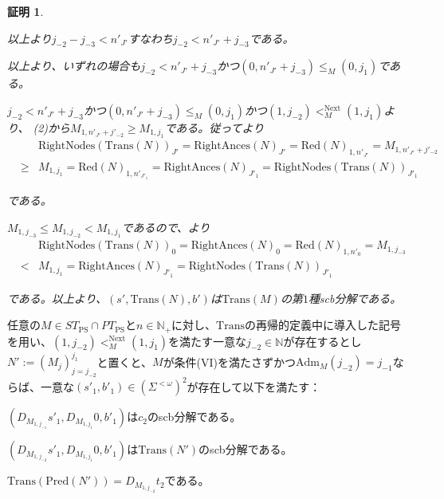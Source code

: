 \documentclass[dvipdfmx,uplatex]{jsarticle}
\theoremstyle{customnonumberbreakfortheorem}
\theoremstyle{customnonumberbreakforproof}
\newtheorem{hideableproof}{証明}
\begin{document}
\begin{hideableproof}
\begin{indented}
\begin{indented}
\begin{indented}
\begin{indented}
				\end{indented}
				\item 以上より\(j_{-2}-j_{-3} < n'_{J'}\)すなわち\(j_{-2} < n'_{J'}+j_{-3}\)である。
			\end{indented}
			\item 以上より、いずれの場合も\(j_{-2} < n'_{J'}+j_{-3}\)かつ\((0,n'_{J'}+j_{-3}) \leq_M (0,j_1)\)である。
			\item \(j_{-2} < n'_{J'}+j_{-3}\)かつ\((0,n'_{J'}+j_{-3}) \leq_M (0,j_1)\)かつ\((1,j_{-2}) <_M^{\textrm{Next}} (1,j_1)\)より、 (2)から\(M_{1,n'_{J'}+j'_{-2}} \geq M_{1,j_1}\)である。従ってより
			\begin{eqnarray*}
			& & \textrm{RightNodes}(\textrm{Trans}(N))_{J'} = \textrm{RightAnces}(N)_{J'} = \textrm{Red}(N)_{1,n'_{J'}} = M_{1,n'_{J'}+j'_{-2}} \\
			& \geq & M_{1,j_1} = \textrm{Red}(N)_{1,n'_{J'_1}} =  \textrm{RightAnces}(N)_{J'_1} = \textrm{RightNodes}(\textrm{Trans}(N))_{J'_1}
			\end{eqnarray*}
			\item である。
		\end{indented}
		\item
		\item \(M_{1,j_{-3}} \leq M_{1,j_{-2}} < M_{1,j_1}\)であるので、より
		\begin{eqnarray*}
		& & \textrm{RightNodes}(\textrm{Trans}(N))_0 = \textrm{RightAnces}(N)_0 = \textrm{Red}(N)_{1,n'_0} = M_{1,j_{-3}} \\
		& < & M_{1,j_1} = \textrm{RightAnces}(N)_{J'_1} = \textrm{RightNodes}(\textrm{Trans}(N))_{J'_1}
		\end{eqnarray*}
		\item である。以上より、\((s',\textrm{Trans}(N),b')\)は\(\textrm{Trans}(M)\)の第\(1\)種scb分解である。
	\end{indented}
\end{hideableproof}

\begin{lemma}\label{条件(III)～(V)の下での切片のscb分解}
	任意の\(M \in ST_{\textrm{PS}} \cap PT_{\textrm{PS}}\)と\(n \in \mathbb{N}_{+}\)に対し、\(\textrm{Trans}\)の再帰的定義中に導入した記号を用い、\((1,j_{-2}) <_M^{\textrm{Next}} (1,j_1)\)を満たす一意な\(j_{-2} \in \mathbb{N}\)が存在するとし\(N' := (M_j)_{j=j_{-2}}^{j_1}\)と置くと、\(M\)が条件(VI)を満たさずかつ\(\textrm{Adm}_M(j_{-2}) = j_{-1}\)ならば、一意な\((s'_1,b'_1) \in (\Sigma^{< \omega})^2\)が存在して以下を満たす：
	\begin{penumerate}
		\item \((D_{M_{1,j_{-1}}} s'_1,D_{M_{1,j_1}} 0,b'_1)\)は\(c_2\)のscb分解である。
		\item \((D_{M_{1,j_{-2}}} s'_1,D_{M_{1,j_1}} 0,b'_1)\)は\(\textrm{Trans}(N')\)のscb分解である。
		\item \(\textrm{Trans}(\textrm{Pred}(N')) = D_{M_{1,j_{-2}}} t_2\)である。
	\end{penumerate}
\end{lemma}
\end{document}
